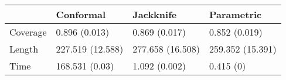 \begin{tabular}{|l|l|l|l|}
\hline
& Conformal & Jackknife & Parametric \\
\hline
Coverage & 0.896 (0.013) & 0.869 (0.017) & 0.852 (0.019) \\
\hline
Length & 227.519 (12.588) & 277.658 (16.508) & 259.352 (15.391) \\
\hline
Time & 168.531 (0.03) & 1.092 (0.002) & 0.415 (0) \\
\hline
\end{tabular}
